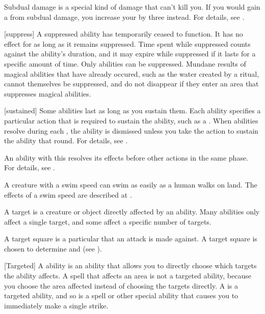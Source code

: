 Subdual damage is a special kind of damage that can't kill you.
If you would gain a  from subdual damage, you increase your  by three instead.
For details, see .

[suppress] A suppressed ability has temporarily ceased to function.
It has no effect for as long as it remains suppressed.
Time spent while suppressed counts against the ability's duration, and it may expire while suppressed if it lasts for a specific amount of time.
Only \magical abilities can be suppressed.
Mundane results of magical abilities that have already occured, such as the water created by a  ritual, cannot themselves be suppressed, and do not disappear if they enter an area that suppresses magical abilities.

[sustained] Some abilities last as long as you sustain them.
Each ability specifies a particular action that is required to sustain the ability, such as a .
When  abilities resolve during each , the ability is dismissed unless you take the action to sustain the ability that round.
For details, see .

 An ability with this  resolves its effects before other actions in the same phase.
For details, see .

 A creature with a swim speed can swim as easily as a human walks on land.
The effects of a swim speed are described at .

 A target is a creature or object directly affected by an ability.
Many abilities only affect a single target, and some affect a specific number of targets.

 A target square is a particular  that an attack is made against.
A target square is chosen to determine  and  (see ).

[Targeted] A  ability is an ability that allows you to directly choose which targets the ability affects.
A spell that affects an area is not a targeted ability, because you choose the area affected instead of choosing the targets directly.
A  is a targeted ability, and so is a spell or other special ability that causes you to immediately make a single strike.


